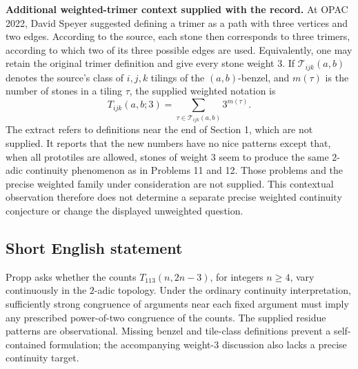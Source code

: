 \documentclass[11pt]{article}
\begin{document}
\textbf{Additional weighted-trimer context supplied with the record.} At OPAC 2022, David Speyer suggested defining a trimer as a path with three vertices and two edges. According to the source, each stone then corresponds to three trimers, according to which two of its three possible edges are used. Equivalently, one may retain the original trimer definition and give every stone weight \(3\). If \(\mathcal T_{ijk}(a,b)\) denotes the source's class of \(i,j,k\) tilings of the \((a,b)\)-benzel, and \(m(\tau)\) is the number of stones in a tiling \(\tau\), the supplied weighted notation is
\[
 T_{ijk}(a,b;3)=\sum_{\tau\in\mathcal T_{ijk}(a,b)}3^{m(\tau)}.
\]
The extract refers to definitions near the end of Section 1, which are not supplied. It reports that the new numbers have no nice patterns except that, when all prototiles are allowed, stones of weight \(3\) seem to produce the same \(2\)-adic continuity phenomenon as in Problems 11 and 12. Those problems and the precise weighted family under consideration are not supplied. This contextual observation therefore does not determine a separate precise weighted continuity conjecture or change the displayed unweighted question.
\subsection{Short English statement}
Propp asks whether the counts \(T_{113}(n,2n-3)\), for integers \(n\geq4\), vary continuously in the \(2\)-adic topology. Under the ordinary continuity interpretation, sufficiently strong congruence of arguments near each fixed argument must imply any prescribed power-of-two congruence of the counts. The supplied residue patterns are observational. Missing benzel and tile-class definitions prevent a self-contained formulation; the accompanying weight-\(3\) discussion also lacks a precise continuity target.
\end{document}
